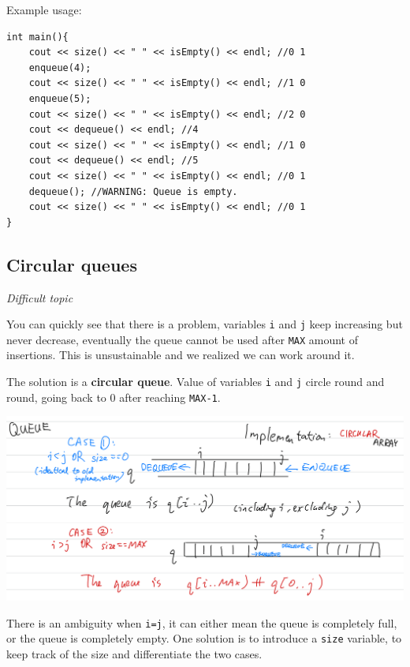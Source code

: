 Example usage:

\begin{lstlisting}
int main(){
    cout << size() << " " << isEmpty() << endl; //0 1
    enqueue(4);
    cout << size() << " " << isEmpty() << endl; //1 0
    enqueue(5);
    cout << size() << " " << isEmpty() << endl; //2 0
    cout << dequeue() << endl; //4
    cout << size() << " " << isEmpty() << endl; //1 0
    cout << dequeue() << endl; //5
    cout << size() << " " << isEmpty() << endl; //0 1
    dequeue(); //WARNING: Queue is empty.
    cout << size() << " " << isEmpty() << endl; //0 1
}
\end{lstlisting}

\subsection{Circular queues}

\textit{Difficult topic}
\vspace{6mm}

You can quickly see that there is a problem, variables \texttt{i} and \texttt{j} keep increasing but never decrease, eventually the queue cannot be used after \texttt{MAX} amount of insertions. This is unsustainable and we realized we can work around it.
\vspace{6mm}

The solution is a \textbf{circular queue}. Value of variables \texttt{i} and \texttt{j} circle round and round, going back to 0 after reaching \texttt{MAX-1}.

\includegraphics[width=15cm]{images/ch6-cq.png}

There is an ambiguity when \texttt{i=j}, it can either mean the queue is completely full, or the queue is completely empty. One solution is to introduce a \texttt{size} variable, to keep track of the size and differentiate the two cases.

